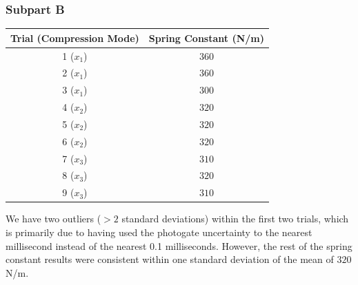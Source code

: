 \documentclass[8pt]{extarticle}
\begin{document}
{\subsubsection*{Subpart B}
\begin{center}
	\renewcommand{\arraystretch}{1.5}
	\begin{tabular}{c|c}
		Trial (Compression Mode) & Spring Constant (N/m) \\
		\hline
		1 ($x_1$) & $360$ \\
		2 ($x_1$) & $360$ \\
		3 ($x_1$) & $300$ \\
		4 ($x_2$) & $320$ \\
		5 ($x_2$) & $320$ \\
		6 ($x_2$) & $320$ \\
		7 ($x_3$) & $310$ \\
		8 ($x_3$) & $320$ \\
		9 ($x_3$) & $310$ 
	\end{tabular}
\end{center}
We have two outliers ($>2$ standard deviations) within the first two trials, which is primarily due to having used the photogate uncertainty to the nearest millisecond instead of the nearest 0.1 milliseconds. However, the rest of the spring constant results were consistent within one standard deviation of the mean of $320$ N/m.
}
\end{document}
